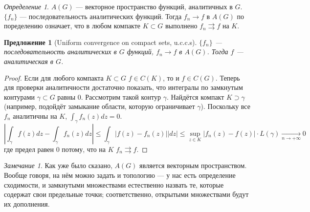 \documentclass[12pt]{article}
\newcounter{cnt}
\theoremstyle{thmnote}
\newtheorem{proposition}[cnt]{Предложение}
\theoremstyle{remark}
\newtheorem*{remark}{Замечание}
\theoremstyle{defnote}
\newtheorem{definition}[cnt]{Определение}
\begin{document}
\begin{definition}
    $A(G)$ --- векторное пространство функций, аналитичных в $G$. \\
    $\{f_n\}$ --- последовательность аналитических функций. Тогда $f_n \to f$ в $A(G)$ по поределению означает, что в любом компакте $K \subset G$ выполнено $f_n \rightrightarrows f$ на $K$.
\end{definition}

\begin{proposition}[Uniform convergence on compact sets, u.c.c.s]
\label{uccs}
    $\{f_n\}$ --- последовательность аналитических в $G$ функций, $f_n \to f$ в $A(G)$. Тогда $f$ --- аналитическая в $G$.
\end{proposition}
\begin{proof}
    Если для любого компакта $K \subset G$ $f \in C(K)$, то и $f \in C(G)$. Теперь для проверки аналитичности достаточно показать, что интегралы по замкнутым контурами $\gamma \subset G$ равны 0. Рассмотрим такой контур $\gamma$. Найдётся компакт $K \supset \gamma$ (например, подойдёт замыкание области, которую ограничивает $\gamma$). Поскольку все $f_n$ аналитичны на $K$, $\int_\gamma f_n(z)dz = 0$.
    \begin{equation*}
        \left| \int_\gamma f(z)dz - \int_\gamma f_n(z)dz \right| \leq \int_\gamma |f(z) - f_n(z)| |dz| \leq \underset{z \in K}{\sup} |f_n(z) - f(z)| \cdot L(\gamma) \underset{n \to +\infty}{\longrightarrow} 0
    \end{equation*}
    где предел равен 0 потому, что на $K$ $f_n \rightrightarrows f$.
\end{proof}

\begin{remark}
    Как уже было сказано, $A(G)$ является векторным пространством. Вообще говоря, на нём можно задать и топологию --- у нас есть определение сходимости, и замкнутыми множествами естественно назвать те, которые содержат свои предельные точки; соответственно, открытыми множествами будут их дополнения.
\end{remark}
\end{document}
